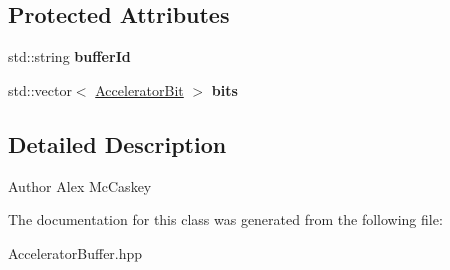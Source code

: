 \subsection*{Protected Attributes}
\begin{DoxyCompactItemize}
\item 
std\+::string {\bfseries buffer\+Id}\hypertarget{a00032_adca17dc5025c067a927aefd6a5cbe51b}{}\label{a00032_adca17dc5025c067a927aefd6a5cbe51b}

\item 
std\+::vector$<$ \hyperlink{a00031}{Accelerator\+Bit} $>$ {\bfseries bits}\hypertarget{a00032_a36b3300cbada4e54e9e68d1c7c135c9b}{}\label{a00032_a36b3300cbada4e54e9e68d1c7c135c9b}

\end{DoxyCompactItemize}


\subsection{Detailed Description}
\begin{DoxyAuthor}{Author}
Alex Mc\+Caskey 
\end{DoxyAuthor}


The documentation for this class was generated from the following file\+:\begin{DoxyCompactItemize}
\item 
Accelerator\+Buffer.\+hpp\end{DoxyCompactItemize}
